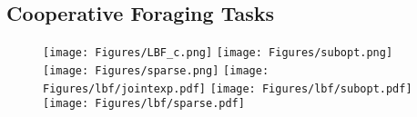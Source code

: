 \documentclass{article}
\begin{document}
\subsection{Cooperative Foraging Tasks}\label{exp:foraging}



\begin{figure}
\centering
\texttt{[image: Figures/LBF\_c.png]}\hspace{10 mm}
\texttt{[image: Figures/subopt.png]}\hspace{8 mm}
\texttt{[image: Figures/sparse.png]}\vspace{-0.5 mm}
\texttt{[image: Figures/lbf/jointexp.pdf]}
\texttt{[image: Figures/lbf/subopt.pdf]}
\texttt{[image: Figures/lbf/sparse.pdf]}
\vspace{-2mm}
\label{fig:foraging}
\end{figure}
\end{document}
